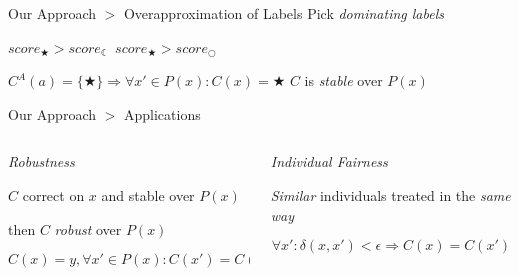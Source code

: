 \documentclass[11pt]{beamer}
\begin{document}
\begin{frame}{Our Approach $>$ Overapproximation of Labels}
Pick \emph{dominating labels}
\begin{center}
 
 
 $score_\bigstar > score_{\leftmoon}$
 \hspace{1em}
 $score_\bigstar > score_{\bigcirc}$
\end{center}

$C^A(a) = \{\bigstar\} \Rightarrow \forall x' \in P(x)\colon C(x) = \bigstar$
\hspace{2em}
$C$ is \emph{stable} over $P(x)$
\end{frame}

\begin{frame}{Our Approach $>$ Applications}
\begin{columns}
 \begin{column}{0.5\textwidth}
  \centering
  \emph{Robustness}
  
  $C$ correct on $x$ and stable over $P(x)$
  
  then $C$ \emph{robust} over $P(x)$
  
  \begin{center}
   
  \end{center}
  \[
   C(x) = y, \forall x' \in P(x)\colon C(x') = C(x)
  \]
 \end{column}
 \begin{column}{0.5\textwidth}
  \centering
  \emph{Individual Fairness}
  
  \emph{Similar} individuals treated in the \emph{same way}
  
  \begin{center}
   
  \end{center}
  \[
   \forall x' \colon \delta(x, x') < \epsilon \Rightarrow C(x) = C(x')
  \]
 \end{column}
\end{columns}
\end{frame}
\end{document}
